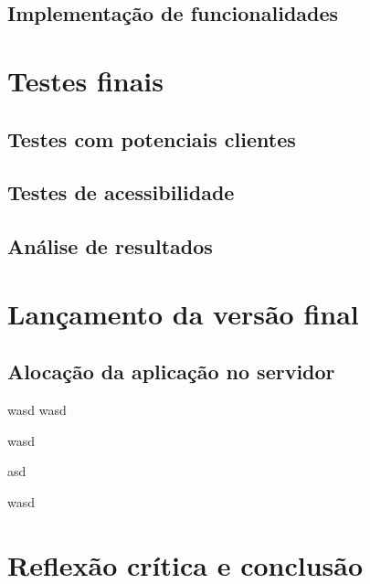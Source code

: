 \documentclass[11pt, twoside]{report}
\begin{document}
	\section{Implementação de funcionalidades}
	
	\chapter{Testes finais}
	\section{Testes com potenciais clientes}
	\section{Testes de acessibilidade}
	\section{Análise de resultados}
	
	\chapter{Lançamento da versão final}
	\section{Alocação da aplicação no servidor}
	
	\pagebreak
	wasd
	wasd
	
	
	wasd
	
	
	\pagebreak
	
	asd
	
	wasd

	\chapter{Reflexão crítica e conclusão}
	
	

	
	
	
\end{document}
